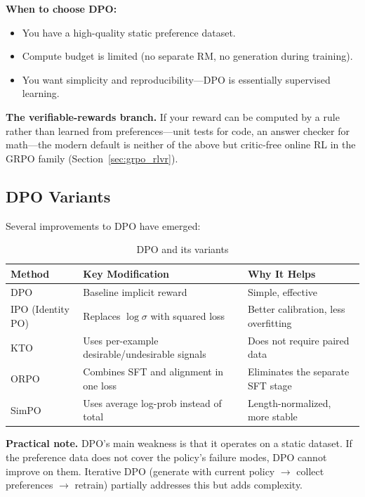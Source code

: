 \textbf{When to choose DPO:}
\begin{itemize}
    \item You have a high-quality static preference dataset.
    \item Compute budget is limited (no separate RM, no generation during training).
    \item You want simplicity and reproducibility---DPO is essentially supervised learning.
\end{itemize}

\textbf{The verifiable-rewards branch.} If your reward can be computed by a rule rather than learned from preferences---unit tests for code, an answer checker for math---the modern default is neither of the above but critic-free online RL in the GRPO family (Section~\ref{sec:grpo_rlvr}).

\subsection{DPO Variants}

Several improvements to DPO have emerged:

\begin{table}[H]
\centering
\caption{DPO and its variants}
\begin{tabularx}{\textwidth}{lXX}
\toprule
\textbf{Method} & \textbf{Key Modification} & \textbf{Why It Helps} \\
\midrule
DPO & Baseline implicit reward & Simple, effective \\
IPO (Identity PO) & Replaces $\log\sigma$ with squared loss & Better calibration, less overfitting \\
KTO & Uses per-example desirable/undesirable signals & Does not require paired data \\
ORPO & Combines SFT and alignment in one loss & Eliminates the separate SFT stage \\
SimPO & Uses average log-prob instead of total & Length-normalized, more stable \\
\bottomrule
\end{tabularx}
\end{table}

\textbf{Practical note.} DPO's main weakness is that it operates on a static dataset. If the preference data does not cover the policy's failure modes, DPO cannot improve on them. Iterative DPO (generate with current policy $\rightarrow$ collect preferences $\rightarrow$ retrain) partially addresses this but adds complexity.

